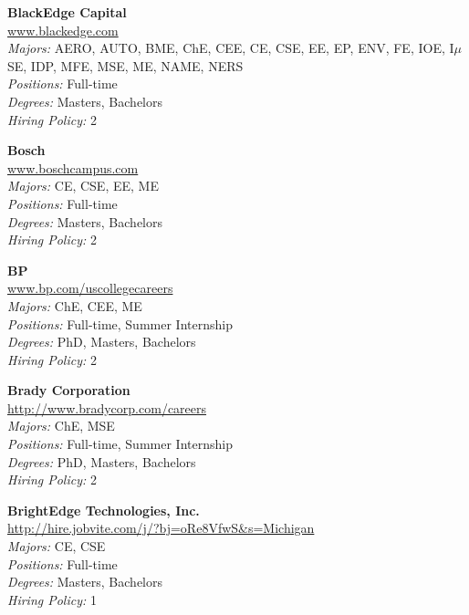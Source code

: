 \documentclass[twoside]{article}
\begin{document}
\begin{center}
\begin{multicols}{3}
\begin{minipage}{.9\columnwidth}{\Large\bf BlackEdge Capital }\\
	\url{www.blackedge.com}\\
	\emph{Majors:} AERO, AUTO, BME, ChE, CEE, CE, CSE, EE, EP, ENV, FE, IOE, I$\mu$SE, IDP, MFE, MSE, ME, NAME, NERS\\
	\emph{Positions:} Full-time\\
	\emph{Degrees:} Masters, Bachelors\\
	\emph{Hiring Policy:} 2\\
\end{minipage}
 
\begin{minipage}{.9\columnwidth}{\Large\bf Bosch }\\
	\url{www.boschcampus.com}\\
	\emph{Majors:} CE, CSE, EE, ME\\
	\emph{Positions:} Full-time\\
	\emph{Degrees:} Masters, Bachelors\\
	\emph{Hiring Policy:} 2\\
\end{minipage}
 
\begin{minipage}{.9\columnwidth}{\Large\bf BP }\\
	\url{www.bp.com/uscollegecareers}\\
	\emph{Majors:} ChE, CEE, ME\\
	\emph{Positions:} Full-time, Summer Internship\\
	\emph{Degrees:} PhD, Masters, Bachelors\\
	\emph{Hiring Policy:} 2\\
\end{minipage}
 
\begin{minipage}{.9\columnwidth}{\Large\bf Brady Corporation }\\
	\url{http://www.bradycorp.com/careers}\\
	\emph{Majors:} ChE, MSE\\
	\emph{Positions:} Full-time, Summer Internship\\
	\emph{Degrees:} PhD, Masters, Bachelors\\
	\emph{Hiring Policy:} 2\\
\end{minipage}
 
\begin{minipage}{.9\columnwidth}{\Large\bf BrightEdge Technologies, Inc. }\\
	\url{http://hire.jobvite.com/j/?bj=oRe8VfwS&s=Michigan}\\
	\emph{Majors:} CE, CSE\\
	\emph{Positions:} Full-time\\
	\emph{Degrees:} Masters, Bachelors\\
	\emph{Hiring Policy:} 1\\
\end{minipage}
 

\end{multicols}
\end{center}
\end{document}
